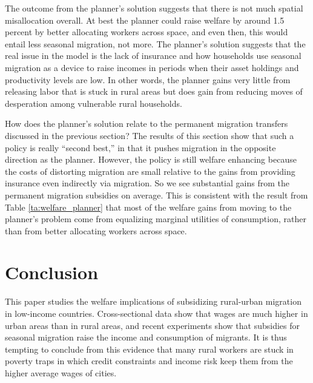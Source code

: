 \documentclass[12pt,pdftex]{article}
\begin{document}
The outcome from the planner's solution suggests that there is not much spatial misallocation overall. At best the planner could raise welfare by around 1.5 percent by better allocating workers across space, and even then, this would entail less seasonal migration, not more. The planner's solution suggests that the real issue in the model is the lack of insurance and how households use seasonal migration as a device to raise incomes in periods when their asset holdings and productivity levels are low. In other words, the planner gains very little from releasing labor that is stuck in rural areas but does gain from reducing moves of desperation among vulnerable rural households.

How does the planner's solution relate to the permanent migration transfers discussed in the previous section? The results of this section show that such a policy is really ``second best,'' in that it pushes migration in the opposite direction as the planner. However, the policy is still welfare enhancing because the costs of distorting migration are small relative to the gains from providing insurance even indirectly via migration. So we see substantial gains from the permanent migration subsidies on average. This is consistent with the result from Table \ref{ta:welfare_planner} that most of the welfare gains from moving to the planner's problem come from equalizing marginal utilities of consumption, rather than from better allocating workers across space.


\section{Conclusion} \label{sec:conclusion}

This paper studies the welfare implications of subsidizing rural-urban migration in low-income countries. Cross-sectional data show that wages are much higher in urban areas than in rural areas, and recent experiments show that subsidies for seasonal migration raise the income and consumption of migrants. It is thus tempting to conclude from this evidence that many rural workers are stuck in poverty traps in which credit constraints and income risk keep them from the higher average wages of cities.
\end{document}
